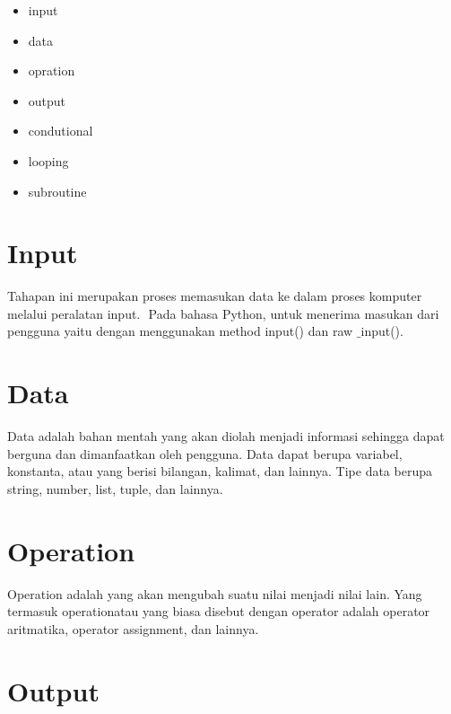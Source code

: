 {\begin{itemize}
	\item input 
	\item data
	\item opration
	\item output
	\item condutional
	\item looping
	\item subroutine
\end{itemize}
\vspace{14pt}
\noindent 
{\fontsize{14pt}{14pt}\section {Input}
\noindent 
{\fontsize{14pt}{14pt}\selectfont Tahapan ini merupakan proses memasukan data ke dalam proses komputer melalui peralatan $  $input. $  $ Pada bahasa Python, untuk menerima masukan dari pengguna yaitu dengan menggunakan $  $method input() $  $dan $  $raw $  \_  $input(). \\} \par
\noindent 
{\fontsize{14pt}{14pt}\section {Data}
\noindent 
{\fontsize{14pt}{14pt}\selectfont Data adalah bahan mentah yang akan diolah menjadi informasi sehingga dapat berguna dan dimanfaatkan oleh pengguna. Data dapat berupa variabel, konstanta, atau yang berisi bilangan, kalimat, dan lainnya. Tipe data berupa string, number, list, tuple, dan lainnya. \\} \par
\vspace{14pt}
\noindent 
{\fontsize{14pt}{14pt}\section {Operation}
\noindent 
{\fontsize{14pt}{14pt}\selectfont Operation $  $adalah yang akan mengubah suatu nilai menjadi nilai lain. Yang termasuk $  $operationatau yang biasa disebut dengan operator adalah operator aritmatika, operator assignment, dan lainnya. \\} \par
\vspace{14pt}
\noindent 
{\fontsize{14pt}{14pt}\section {Output}
}}}}}
